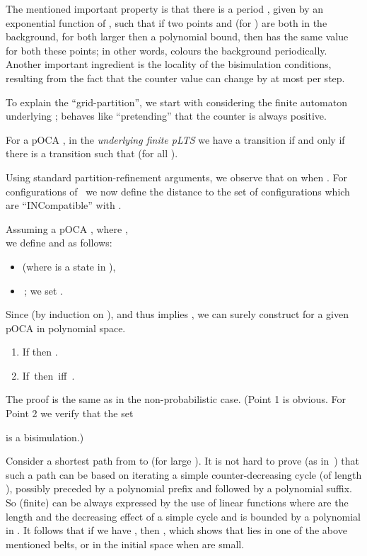 The mentioned important property is that
there is a period , given by an exponential function of ,
such that
if two points  and 
(for )
are both in the background, for both  larger then a polynomial bound, then
 has the same value for both these points; in other words,
 colours the background periodically.
Another important ingredient is the locality of the bisimulation conditions,
resulting from the fact that the counter value can change by at most 
per step.

To explain the ``grid-partition'', we start with
 considering the finite automaton 
underlying ;
 behaves like  ``pretending'' that the
counter is always positive.





\begin{definition}\label{D underlying}
For a pOCA
,
in the {\em underlying finite pLTS}
 we have
a transition  if and only if there is a transition 
such that  (for all
).
\end{definition}
Using standard partition-refinement arguments, we observe
that  on  when .
For configurations of~ we now define the distance
 to the set of configurations which are
``INCompatible'' with .
\begin{definition}
Assuming a pOCA
, where ,
\\
we define  and
 as follows:
\begin{itemize}
\item
 (where 
is a state in ),
\item
\,;
we set .
\end{itemize}
\end{definition}
Since  (by induction on ), and thus
 implies
,
we can surely construct  for a given pOCA in polynomial space.


\begin{proposition}
\label{L nonreachable}
\hfill
\begin{enumerate}
\item
If  then .
\item
\mbox{If 
then
 iff .}
\end{enumerate}
\end{proposition}
The proof is the same as in the non-probabilistic case.
(Point 1 is obvious. For Point 2 we verify that the set

is a bisimulation.)

Consider a shortest path from  to  (for large ).
It is not hard to prove (as in~\cite[Lemma 10]{BGJ:Concur10}) that such a path can be based on iterating
a simple counter-decreasing cycle (of length
), possibly preceded by a polynomial prefix and followed by a
polynomial suffix.
So (finite)  can be always expressed
by the use of linear functions  where
 are the length and the decreasing effect of a simple
cycle and  is bounded by a polynomial in .
It follows that if we have ,
then ,
which shows that
 lies in one of the above mentioned belts, or in the
initial space when  are small.



